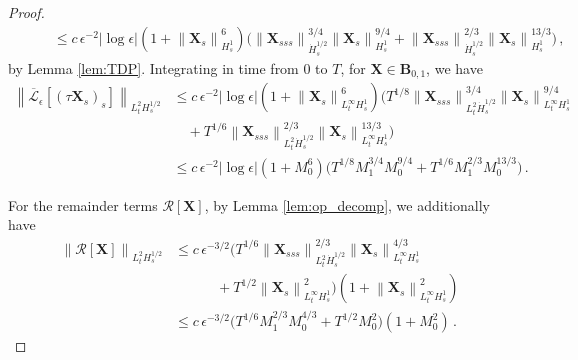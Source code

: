 \documentclass[11pt,reqno]{amsart}
\newcommand{\X}{\bm{X}}
\newcommand{\abs}[1]{\left\lvert #1 \right\rvert}
\newcommand{\norm}[1]{\left\lVert #1 \right\rVert}
\newcommand{\mc}[1]{\mathcal{#1}}
\numberwithin{equation}{section}
\theoremstyle{definition}
\begin{document}
\begin{proof}
\begin{equation}
\begin{aligned}
   &\qquad\le c\,\epsilon^{-2}\abs{\log\epsilon}(1+\norm{\X_s}_{H^1_s}^6)\big(\norm{\X_{sss}}_{\dot H^{1/2}_s}^{3/4}\norm{\X_s}_{H^1_s}^{9/4} + \norm{\X_{sss}}_{\dot H^{1/2}_s}^{2/3}\norm{\X_s}_{H^1_s}^{13/3} \big)\,,
  \end{aligned}
 \end{equation}
by Lemma \ref{lem:TDP}.
 Integrating in time from 0 to $T$, for $\X\in \bm{B}_{0,1}$, we have 
\begin{equation}
\begin{aligned}
 \norm{\overline{\mc{L}}_\epsilon[(\tau\X_s)_s]}_{L^2_tH^{1/2}_s} & 
 \le c\,\epsilon^{-2}\abs{\log\epsilon}(1+\norm{\X_s}_{L^\infty_tH^1_s}^6)\big(T^{1/8}\norm{\X_{sss}}_{L^2_t\dot H^{1/2}_s}^{3/4}\norm{\X_s}_{L^\infty_tH^1_s}^{9/4} \\
 &\quad + T^{1/6}\norm{\X_{sss}}_{L^2_t\dot H^{1/2}_s}^{2/3}\norm{\X_s}_{L^\infty_tH^1_s}^{13/3} \big)\\
 &\le c\,\epsilon^{-2}\abs{\log\epsilon}(1+M_0^6)\big(T^{1/8}M_1^{3/4}M_0^{9/4} + T^{1/6}M_1^{2/3}M_0^{13/3} \big)\,.
\end{aligned}
\end{equation}


For the remainder terms $\mc{R}[\X]$, by Lemma \ref{lem:op_decomp}, we additionally have
\begin{equation}
\begin{aligned}
  \norm{\mc{R}[\X]}_{L^2_tH^{1/2}_s} &\le 
  c\,\epsilon^{-3/2}\big(T^{1/6}\norm{\X_{sss}}_{L^2_t\dot H^{1/2}_s}^{2/3}\norm{\X_s}_{L^\infty_tH^1_s}^{4/3}\\
  &\qquad\quad  + T^{1/2}\norm{\X_s}_{L^\infty_tH^1_s}^2 \big)(1+\norm{\X_s}_{L^\infty_tH^1_s}^2)\\
  &\le c\,\epsilon^{-3/2}\big(T^{1/6}M_1^{2/3}M_0^{4/3} + T^{1/2}M_0^2 \big)(1+M_0^2)\,.
\end{aligned}
\end{equation}



\end{proof}
\end{document}
